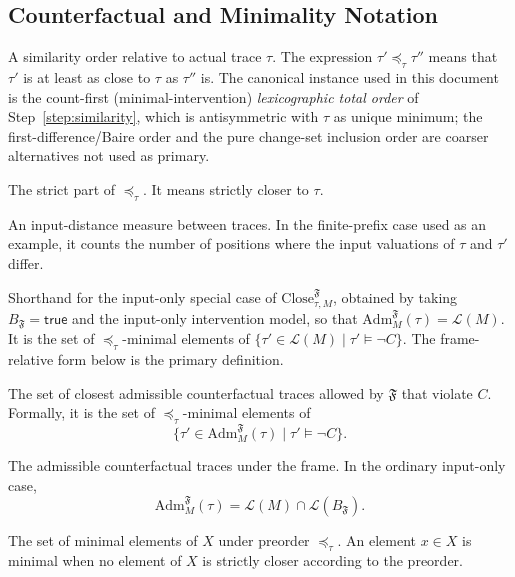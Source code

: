 \documentclass[11pt]{article}
\theoremstyle{remark}
\newcommand{\Close}{\mathrm{Close}}
\newcommand{\Lang}{\mathcal{L}}
\newcommand{\True}{\mathsf{true}}
\newcommand{\Frame}{\mathfrak{F}}
\newcommand{\Adm}{\mathrm{Adm}}
\begin{document}
\subsection*{Counterfactual and Minimality Notation}

\begin{description}[leftmargin=2.8cm,style=nextline]
  \item[\(\preceq_\tau\)]
  A similarity order relative to actual trace \(\tau\). The expression
  \(\tau'\preceq_\tau\tau''\) means that \(\tau'\) is at least as close to
  \(\tau\) as \(\tau''\) is.   The canonical instance used in this document is the count-first
  (minimal-intervention) \emph{lexicographic total order} of
  Step~\ref{step:similarity}, which is antisymmetric with \(\tau\) as unique
  minimum; the first-difference/Baire order and the pure change-set inclusion
  order are coarser alternatives not used as primary.

  \item[\(\prec_\tau\)]
  The strict part of \(\preceq_\tau\). It means strictly closer to \(\tau\).

  \item[\(d_I(\tau,\tau')\)]
  An input-distance measure between traces. In the finite-prefix case used as
  an example, it counts the number of positions where the input valuations of
  \(\tau\) and \(\tau'\) differ.

  \item[\(\Close_{\tau,M}(\neg C)\)]
  Shorthand for the input-only special case of \(\Close_{\tau,M}^{\Frame}\),
  obtained by taking \(B_{\Frame}=\True\) and the input-only intervention model,
  so that \(\Adm_M^{\Frame}(\tau)=\Lang(M)\). It is the set of
  \(\preceq_\tau\)-minimal elements of
  \(\{\tau'\in\Lang(M)\mid \tau'\models\neg C\}\). The frame-relative form below
  is the primary definition.

  \item[\(\Close_{\tau,M}^{\Frame}(\neg C)\)]
  The set of closest admissible counterfactual traces allowed by \(\Frame\) that
  violate \(C\). Formally, it is the set of \(\preceq_\tau\)-minimal elements of
  \[
    \{\tau'\in\Adm_M^{\Frame}(\tau)\mid \tau'\models\neg C\}.
  \]

  \item[\(\Adm_M^{\Frame}(\tau)\)]
  The admissible counterfactual traces under the frame. In the ordinary
  input-only case,
  \[
    \Adm_M^{\Frame}(\tau)=\Lang(M)\cap\Lang(B_{\Frame}).
  \]

  \item[\(\min_{\preceq_\tau} X\)]
  The set of minimal elements of \(X\) under preorder \(\preceq_\tau\). An
  element \(x\in X\) is minimal when no element of \(X\) is strictly closer
  according to the preorder.


\end{description}
\end{document}
